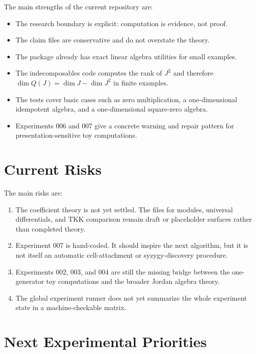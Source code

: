 \documentclass[11pt]{report}
\theoremstyle{definition}
\theoremstyle{plain}
\begin{document}
The main strengths of the current repository are:

\begin{itemize}[leftmargin=*]
  \item The research boundary is explicit: computation is evidence, not proof.
  \item The claim files are conservative and do not overstate the theory.
  \item The package already has exact linear algebra utilities for small
  examples.
  \item The indecomposables code computes the rank of \(J^2\) and therefore
  \(\dim Q(J)=\dim J-\dim J^2\) in finite examples.
  \item The tests cover basic cases such as zero multiplication, a
  one-dimensional idempotent algebra, and a one-dimensional square-zero
  algebra.
  \item Experiments 006 and 007 give a concrete warning and repair pattern for
  presentation-sensitive toy computations.
\end{itemize}

\section{Current Risks}

The main risks are:

\begin{enumerate}[leftmargin=*]
  \item The coefficient theory is not yet settled. The files for modules,
  universal differentials, and TKK comparison remain draft or placeholder
  surfaces rather than completed theory.
  \item Experiment 007 is hand-coded. It should inspire the next algorithm, but
  it is not itself an automatic cell-attachment or syzygy-discovery procedure.
  \item Experiments 002, 003, and 004 are still the missing bridge between the
  one-generator toy computations and the broader Jordan algebra theory.
  \item The global experiment runner does not yet summarize the whole
  experiment state in a machine-checkable matrix.
\end{enumerate}

\section{Next Experimental Priorities}
\end{document}
